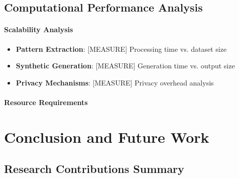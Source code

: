 \documentclass[runningheads]{llncs}
\begin{document}
\subsection{Computational Performance Analysis}
\label{sec:performance}


\paragraph{Scalability Analysis}

\begin{itemize}
\item \textbf{Pattern Extraction}: [MEASURE] Processing time vs. dataset size
\item \textbf{Synthetic Generation}: [MEASURE] Generation time vs. output size
\item \textbf{Privacy Mechanisms}: [MEASURE] Privacy overhead analysis
\end{itemize}

\paragraph{Resource Requirements}


\section{Conclusion and Future Work}
\label{sec:conclusion}


\subsection{Research Contributions Summary}
\end{document}
